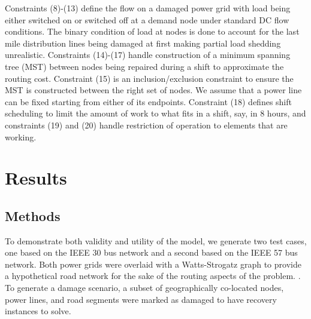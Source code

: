\documentclass[10pt]{article}
\begin{document}
Constraints (8)-(13) define the flow on a damaged power grid with load being either switched on or switched off at a demand node under standard DC flow conditions. The binary condition of load at nodes is done to account for the last mile distribution lines being damaged at first making partial load shedding unrealistic. Constraints (14)-(17) handle construction of a minimum spanning tree (MST) between nodes being repaired during a shift to approximate the routing cost. Constraint (15) is an inclusion/exclusion constraint to ensure the MST is constructed between the right set of nodes. We assume that a power line can be fixed starting from either of its endpoints. Constraint (18) defines shift scheduling to limit the amount of work to what fits in a shift, say, in 8 hours, and constraints (19) and (20) handle restriction of operation to elements that are working.
\section{\large{Results}}
\vspace*{-12pt}
\subsection{Methods}
 \vspace*{-12pt}
 
To demonstrate both validity and utility of the model, we generate two test cases, one based on the IEEE 30 bus network and a second based on the IEEE 57 bus network. Both power grids were overlaid with a Watts-Strogatz graph to provide a hypothetical road network for the sake of the routing aspects of the problem. \cite{Watts1998} . To generate a damage scenario, a subset of geographically co-located nodes, power lines, and road segments were marked as damaged to have recovery instances to solve.
 
\end{document}
